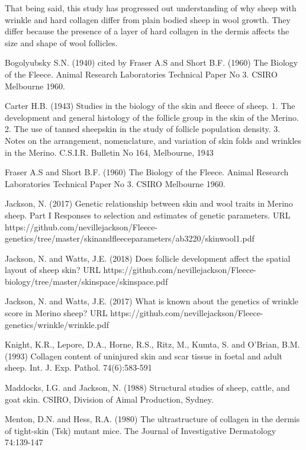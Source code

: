 \documentclass[titlepage]{article}  %
\begin{document}
That being said, this study has progressed out understanding of why sheep with wrinkle and hard collagen differ from plain bodied sheep in wool growth. They differ because the presence of a layer of hard collagen in the dermis affects the size and shape of wool follicles.

\clearpage
\begin{thebibliography}{99}

 Bogolyubsky S.N. (1940) cited by Fraser A.S and Short B.F. (1960) The Biology of the Fleece. Animal Research Laboratories Technical Paper No 3. CSIRO Melbourne 1960.


Carter H.B. (1943) Studies in the biology of the skin and fleece of sheep. 1. The development and general histology of the follicle group in the skin of the Merino. 2. The use of tanned sheepskin in the study of follicle population density. 3. Notes on the arrangement, nomenclature, and variation of skin folds and wrinkles in the Merino. C.S.I.R. Bulletin No 164, Melbourne, 1943

Fraser A.S and Short B.F. (1960) The Biology of the Fleece. Animal Research Laboratories Technical Paper No 3. CSIRO Melbourne 1960.


Jackson, N. (2017) Genetic relationship between skin and wool traits in Merino sheep. Part I Responses to selection and estimates of genetic parameters. URL https://github.com/nevillejackson/Fleece-genetics/tree/master/skinandfleeceparameters/ab3220/skinwool1.pdf

Jackson, N. and Watts, J.E. (2018) Does follicle development affect the spatial layout of sheep skin? URL https://github.com/nevillejackson/Fleece-biology/tree/master/skinspace/skinspace.pdf


Jackson, N. and Watts, J.E. (2017) What is known about the genetics of wrinkle score in Merino sheep? URL https://github.com/nevillejackson/Fleece-genetics/wrinkle/wrinkle.pdf

Knight, K.R., Lepore, D.A., Horne, R.S., Ritz, M., Kumta, S. and O'Brian, B.M. (1993) Collagen content of uninjured skin and scar tissue in foetal and adult sheep. Int. J. Exp. Pathol. 74(6):583-591

Maddocks, I.G. and Jackson, N. (1988) Structural studies of sheep, cattle, and goat skin. CSIRO, Division of Aimal Production, Sydney.

Menton, D.N. and Hess, R.A. (1980) The ultrastructure of collagen in the dermis of tight-skin (Tsk) mutant mice. The Journal of Investigative Dermatology 74:139-147


\end{thebibliography}
\end{document}
